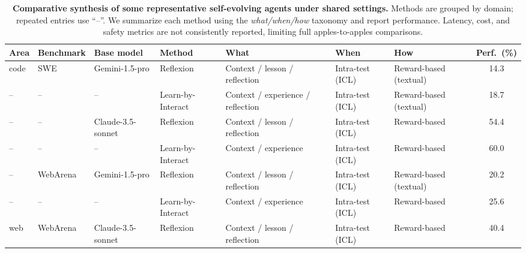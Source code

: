 \begin{table}[t]
\footnotesize
\centering
\caption{\textbf{Comparative synthesis of some representative self-evolving agents under shared settings.}
Methods are grouped by domain; repeated entries use ``--''. We summarize each method using the
\textit{what/when/how} taxonomy and report performance. Latency, cost, and safety metrics are not
consistently reported, limiting full apples-to-apples comparisons.}
\label{tab:comparative_synthesis_tasks}

\renewcommand{\arraystretch}{1.05}
\setlength{\tabcolsep}{1.5pt}

\begin{tabularx}{\textwidth}{l l p{2.0cm} p{2.4cm} X X X c}
\toprule
\textbf{Area} & \textbf{Benchmark} & \textbf{Base model} & \textbf{Method}
& \textbf{What} & \textbf{When} & \textbf{How} & \textbf{Perf.\ (\%)} \\
\midrule

code & SWE & Gemini-1.5-pro & Reflexion \citep{shinn2023reflexion}
& Context / lesson / reflection
& Intra-test (ICL)
& Reward-based (textual)
& 14.3 \\

-- & -- & -- & Learn-by-Interact \citep{su2025learnbyinteractdatacentricframeworkselfadaptive}
& Context / experience / reflection
& Intra-test (ICL)
& Reward-based (textual)
& 18.7 \\

-- & -- & Claude-3.5-sonnet & Reflexion \citep{shinn2023reflexion}
& Context / lesson / reflection
& Intra-test (ICL)
& Reward-based
& 54.4 \\

-- & -- & -- & Learn-by-Interact \citep{su2025learnbyinteractdatacentricframeworkselfadaptive}
& Context / experience
& Intra-test (ICL)
& Reward-based
& 60.0 \\

-- & WebArena & Gemini-1.5-pro & Reflexion \citep{shinn2023reflexion}
& Context / lesson / reflection
& Intra-test (ICL)
& Reward-based (textual)
& 20.2 \\

-- & -- & -- & Learn-by-Interact \citep{su2025learnbyinteractdatacentricframeworkselfadaptive}
& Context / experience
& Intra-test (ICL)
& Reward-based
& 25.6 \\
\midrule

web & WebArena & Claude-3.5-sonnet & Reflexion \citep{shinn2023reflexion}
& Context / lesson / reflection
& Intra-test (ICL)
& Reward-based
& 40.4 \\


\end{tabularx}
\end{table}
